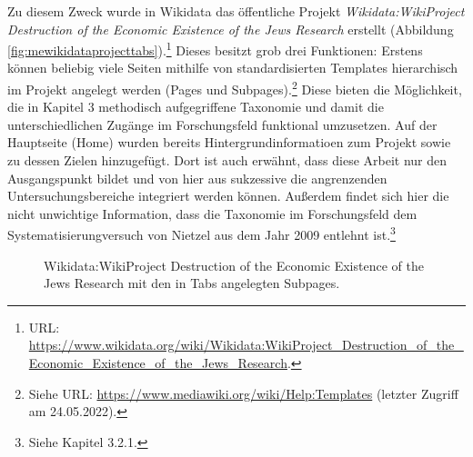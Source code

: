 Zu diesem Zweck wurde in Wikidata das öffentliche Projekt \textit{Wikidata:WikiProject Destruction of the Economic Existence of the Jews Research} erstellt (Abbildung \ref{fig:mewikidataprojecttabs}).\footnote{URL: \url{https://www.wikidata.org/wiki/Wikidata:WikiProject_Destruction_of_the_Economic_Existence_of_the_Jews_Research}.} Dieses besitzt grob drei Funktionen: Erstens können beliebig viele Seiten mithilfe von standardisierten Templates hierarchisch im Projekt angelegt werden (Pages und Subpages).\footnote{Siehe URL: \url{https://www.mediawiki.org/wiki/Help:Templates} (letzter Zugriff am 24.05.2022).} Diese bieten die Möglichkeit, die in Kapitel 3 methodisch aufgegriffene Taxonomie und damit die unterschiedlichen Zugänge im Forschungsfeld funktional umzusetzen. Auf der Hauptseite (Home) wurden bereits Hintergrundinformatioen zum Projekt sowie zu dessen Zielen hinzugefügt. Dort ist auch erwähnt, dass diese Arbeit nur den Ausgangspunkt bildet und von hier aus sukzessive die angrenzenden Untersuchungsbereiche integriert werden können. Außerdem findet sich hier die nicht unwichtige Information, dass die Taxonomie im Forschungsfeld dem Systematisierungversuch von Nietzel aus dem Jahr 2009 entlehnt ist.\footnote{Siehe Kapitel 3.2.1.}

\begin{figure}[h]
    \centering
    \caption{Wikidata:WikiProject Destruction of the Economic Existence of the Jews Research mit den in Tabs angelegten Subpages.}
    \label{fig:wikidataprojecttabs}
\end{figure}

